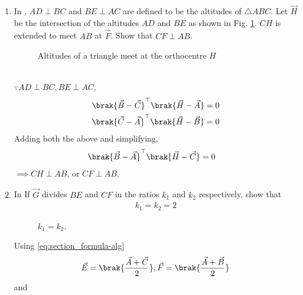 \begin{enumerate}[label=\thesubsection.\arabic*.,ref=\thesubsection.\theenumi]
%
%
\item 
	In ,	
$AD \perp BC$ and $BE \perp AC$ are defined to be the altitudes of $\triangle ABC$.  Let $\vec{H}$ be the intersection of the altitudes $AD$ and $BE$ as shown in Fig. \ref{fig:tri_alt_h}.  $CH$ is extended to meet $AB$ at $\vec{F}$.  Show that $CF \perp AB$.
%
\begin{figure}[!ht]
	\begin{center}
		\resizebox{0.75\columnwidth}{!}{
		
		}
	\end{center}
	\caption{Altitudes of a triangle meet at the orthocentre $H$}
	\label{fig:tri_alt_h}	
\end{figure}
%
\\
\solution $\because AD \perp BC, BE \perp AC$,
%
\begin{align}
\brak{\vec{B}-\vec{C}}^{\top}\brak{\vec{H}-\vec{A}} &= 0  
\\
\brak{\vec{C}-\vec{A}}^{\top}\brak{\vec{H}-\vec{B}} &= 0  
\end{align}
%
Adding both the above and simplifying, 
%
\begin{align}
\brak{\vec{B}-\vec{A}}^{\top}\brak{\vec{H}-\vec{C}} &= 0  
\end{align}
%
$\implies CH \perp AB$, or $CF \perp AB$.  
%
\item 
  In 
	If $\vec{G}$ divides $BE$ and $CF$ in the ratios $k_1$ and $k_2$ respectively, 
	show that
	\begin{align}
\label{eq:tri_med_centroid_ratio}
k_1 = k_2 = 2 
	\end{align}
\begin{figure}[!ht]
	\begin{center}
		\resizebox{0.75\columnwidth}{!}{}
	\end{center}
	\caption{$k_1=k_2$.}
	\label{fig:tri_med_isect}	
\end{figure}
%
\solution 
Using 
	  \eqref{eq:section_formula-alg}
\begin{align}
\vec{E}=\brak{\frac{\vec{A}+\vec{C}}{2}},
\vec{F}=\brak{\frac{\vec{A}+\vec{B}}{2}}
\end{align}
and
  \begin{align}
	  \label{eq:section_formula-G}

\end{align}
\end{enumerate}
